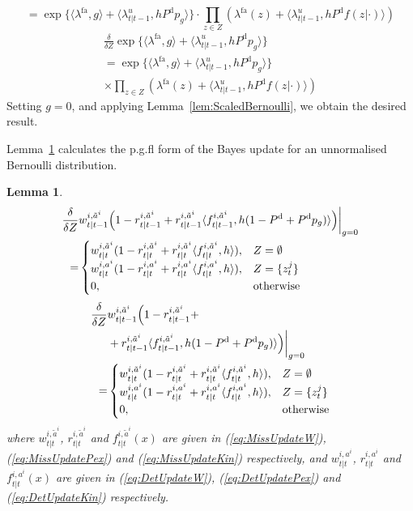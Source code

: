 \documentclass[journal,twoside]{IEEEtran}
\theoremstyle{plain}
\newtheorem{lemma}{Lemma}
\begin{document}
\begin{IEEEproof}
\begin{equation}
= \exp\{ \langle\lambda^\mathrm{fa},g\rangle + \langle\lambda^u_{t|t-1},h P^{\mathrm{d}} p_g\rangle \} 
\cdot \prod_{z\in Z}\left( \lambda^\mathrm{fa}(z) + \langle\lambda^u_{t|t-1},h P^{\mathrm{d}} f(z|\cdot)\rangle \right)
\end{equation}
\else
\begin{multline}
\frac{\delta}{\delta Z} \exp\{ \langle\lambda^\mathrm{fa},g\rangle + \langle\lambda^u_{t|t-1},h P^{\mathrm{d}} p_g\rangle \} \\
= \exp\{ \langle\lambda^\mathrm{fa},g\rangle + \langle\lambda^u_{t|t-1},h P^{\mathrm{d}} p_g\rangle \}  \\
\times \prod_{z\in Z}\left( \lambda^\mathrm{fa}(z) + \langle\lambda^u_{t|t-1},h P^{\mathrm{d}} f(z|\cdot)\rangle \right)
\end{multline}
\fi
%
Setting $g=0$, and applying Lemma~\ref{lem:ScaledBernoulli}, we obtain the desired result.
\end{IEEEproof}
Lemma~\ref{lem:BernoulliUpdate} calculates the p.g.fl form of the Bayes update for an unnormalised Bernoulli distribution.
\begin{lemma}\label{lem:BernoulliUpdate}
\ifCLASSOPTIONdraftcls
\begin{align}
\frac{\delta}{\delta Z}& w_{t|t-1}^{i,\tilde{a}^i} \Big( 1-r_{t|t-1}^{i,\tilde{a}^i} 
 + r_{t|t-1}^{i,\tilde{a}^i}\langle f_{t|t-1}^{i,\tilde{a}^i},h(1-P^{\mathrm{d}} + P^{\mathrm{d}} p_g)\rangle\Big)\bigg|_{g=0}\notag \\
=& \begin{cases}
w^{i,\tilde{a}^i}_{t|t}(1-r^{i,\tilde{a}^i}_{t|t}+r^{i,\tilde{a}^i}_{t|t}\langle f^{i,\tilde{a}^i}_{t|t},h\rangle), & Z=\emptyset \\
w^{i,a^i}_{t|t}(1-r^{i,a^i}_{t|t}+r^{i,a^i}_{t|t}\langle f^{i,a^i}_{t|t},h\rangle), & Z=\{z_t^j\} \\
0, & \mbox{otherwise}
\end{cases}
\end{align}
\else
\begin{align}
\frac{\delta}{\delta Z}& w_{t|t-1}^{i,\tilde{a}^i} \Big( 1-r_{t|t-1}^{i,\tilde{a}^i} + \notag\\
& + r_{t|t-1}^{i,\tilde{a}^i}\langle f_{t|t-1}^{i,\tilde{a}^i},h(1-P^{\mathrm{d}} + P^{\mathrm{d}} p_g)\rangle\Big)\bigg|_{g=0}\notag \\
=& \begin{cases}
w^{i,\tilde{a}^i}_{t|t}(1-r^{i,\tilde{a}^i}_{t|t}+r^{i,\tilde{a}^i}_{t|t}\langle f^{i,\tilde{a}^i}_{t|t},h\rangle), & Z=\emptyset \\
w^{i,a^i}_{t|t}(1-r^{i,a^i}_{t|t}+r^{i,a^i}_{t|t}\langle f^{i,a^i}_{t|t},h\rangle), & Z=\{z_t^j\} \\
0, & \mbox{otherwise}
\end{cases}
\end{align}
\fi
%
where $w^{i,\tilde{a}^i}_{t|t}$, $r^{i,\tilde{a}^i}_{t|t}$ and $f^{i,\tilde{a}^i}_{t|t}(x)$ are given in (\ref{eq:MissUpdateW}), (\ref{eq:MissUpdatePex}) and (\ref{eq:MissUpdateKin}) respectively, and $w^{i,a^i}_{t|t}$, $r^{i,a^i}_{t|t}$ and $f^{i,a^i}_{t|t}(x)$ are given in (\ref{eq:DetUpdateW}), (\ref{eq:DetUpdatePex}) and (\ref{eq:DetUpdateKin}) respectively.
\end{lemma}
\end{document}
